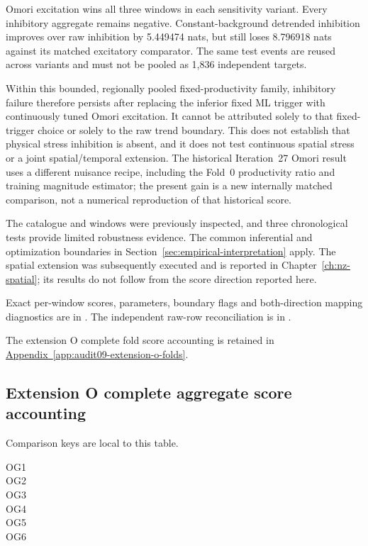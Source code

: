Omori excitation wins all three windows in each sensitivity variant. Every inhibitory aggregate remains negative. Constant-background detrended inhibition improves over raw inhibition by 5.449474 nats, but still loses 8.796918 nats against its matched excitatory comparator. The same test events are reused across variants and must not be pooled as 1,836 independent targets.

Within this bounded, regionally pooled fixed-productivity family, inhibitory failure therefore persists after replacing the inferior fixed ML trigger with continuously tuned Omori excitation. It cannot be attributed solely to that fixed-trigger choice or solely to the raw trend boundary. This does not establish that physical stress inhibition is absent, and it does not test continuous spatial stress or a joint spatial/temporal extension. The historical Iteration~27 Omori result uses a different nuisance recipe, including the Fold~0 productivity ratio and training magnitude estimator; the present gain is a new internally matched comparison, not a numerical reproduction of that historical score.

The catalogue and windows were previously inspected, and three chronological tests provide limited robustness evidence. The common inferential and optimization boundaries in Section~\ref{sec:empirical-interpretation} apply. The spatial extension was subsequently executed and is reported in Chapter~\ref{ch:nz-spatial}; its results do not follow from the score direction reported here.

Exact per-window scores, parameters, boundary flags and both-direction mapping diagnostics are in . The independent raw-row reconciliation is in .

\noindent The extension O complete fold score accounting is retained in \hyperref[app:audit09-extension-o-folds]{Appendix~\ref{app:audit09-extension-o-folds}}.

\subsection{Extension O complete aggregate score accounting}
Comparison keys are local to this table. 
\begin{description}
\item[OG1] 
\item[OG2] 
\item[OG3] 
\item[OG4] 
\item[OG5] 
\item[OG6] 
\end{description}

